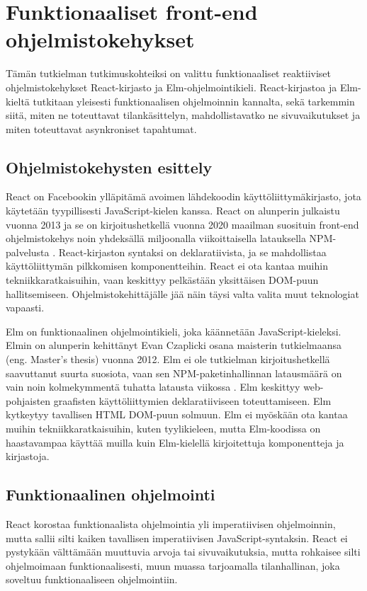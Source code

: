 \chapter{Funktionaaliset front-end ohjelmistokehykset}
Tämän tutkielman tutkimuskohteiksi on valittu funktionaaliset reaktiiviset ohjelmistokehykset React-kirjasto ja
Elm-ohjelmointikieli. React-kirjastoa ja Elm-kieltä tutkitaan yleisesti funktionaalisen ohjelmoinnin kannalta, sekä
tarkemmin siitä, miten ne toteuttavat tilankäsittelyn, mahdollistavatko ne sivuvaikutukset ja miten toteuttavat
asynkroniset tapahtumat.

\section{Ohjelmistokehysten esittely}
React on Facebookin ylläpitämä avoimen lähdekoodin käyttöliittymäkirjasto, jota käytetään tyypillisesti
JavaScript-kielen kanssa. React on alunperin julkaistu vuonna 2013 ja se on kirjoitushetkellä vuonna 2020 maailman
suosituin front-end ohjelmistokehys noin yhdeksällä miljoonalla viikoittaisella latauksella NPM-palvelusta 
\cite{npmtrends}. React-kirjaston syntaksi on deklaratiivista, ja se mahdollistaa käyttöliittymän pilkkomisen
komponentteihin. React ei ota kantaa muihin tekniikkaratkaisuihin, vaan keskittyy pelkästään yksittäisen DOM-puun
hallitsemiseen. Ohjelmistokehittäjälle jää näin täysi valta valita muut teknologiat vapaasti. \cite{reactjs}

Elm on funktionaalinen ohjelmointikieli, joka käännetään JavaScript-kieleksi. Elmin on alunperin kehittänyt Evan
Czaplicki osana maisterin tutkielmaansa (eng. Master's thesis) vuonna 2012. Elm ei ole tutkielman kirjoitushetkellä
saavuttanut suurta suosiota, vaan sen NPM-paketinhallinnan latausmäärä on vain noin kolmekymmentä tuhatta latausta
viikossa \cite{npmtrends}. Elm keskittyy web-pohjaisten graafisten käyttöliittymien deklaratiiviseen toteuttamiseen. Elm
kytkeytyy tavallisen HTML DOM-puun solmuun. Elm ei myöskään ota kantaa muihin tekniikkaratkaisuihin, kuten tyylikieleen,
mutta Elm-koodissa on haastavampaa käyttää muilla kuin Elm-kielellä kirjoitettuja komponentteja ja kirjastoja.
\cite{elmlang}

\section{Funktionaalinen ohjelmointi}
React korostaa funktionaalista ohjelmointia yli imperatiivisen ohjelmoinnin, mutta sallii silti kaiken tavallisen
imperatiivisen JavaScript-syntaksin. React ei pystykään välttämään muuttuvia arvoja tai sivuvaikutuksia, mutta rohkaisee
silti ohjelmoimaan funktionaalisesti, muun muassa tarjoamalla tilanhallinan, joka soveltuu funktionaaliseen
ohjelmointiin. \cite{reactjs}

